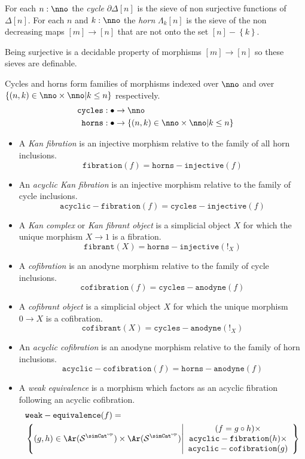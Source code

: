 \documentclass{tac}
\newcommand\cat\mathcal
\newcommand\set[1]{\left\{#1\right\}}
\newcommand\dual{^{\mathrm{op}}}
\newcommand\s{^{\simCat\dual}}
\newcommand\bang{!}
\newcommand\of{:}
\newcommand\simplex\Delta
\newcommand\cycle{\partial\Delta}
\newcommand\horn\Lambda
\newcommand\code\mathtt
\begin{document}
\begin{definition} For each $n\of \nno$ the \emph{cycle} $\cycle[n]$ is the sieve of non surjective functions of $\simplex[n]$. For each $n$ and $k\of\nno$ the \emph{horn} $\horn_k[n]$ is the sieve of the non decreasing maps $[m]\to [n]$ that are not onto the set $[n]-\set{k}$. 
\end{definition}

Being surjective is a decidable property of morphisms $[m]\to[n]$ so these sieves are definable. 

\begin{definition} Cycles and horns form families of morphisms indexed over $\nno$ and over $\set{(n,k)\in\nno\times\nno| k\leq n }$ respectively.
\begin{align*} 
\code{cycles}&\of\bullet\to \nno\\
 \code{horns}&\of\bullet\to\set{(n,k)\in\nno\times\nno| k\leq n }
\end{align*}
\begin{itemize}
\item A \emph{Kan fibration} is an injective morphism relative to the family of all horn inclusions.
\[ \code{fibration}(f) = \code{horns-injective}(f) \]
\item An \emph{acyclic Kan fibration} is an injective morphism relative to the family of cycle inclusions.
\[ \code{acyclic-fibration}(f) = \code{cycles-injective}(f) \]
\item A \emph{Kan complex} or \emph{Kan fibrant object} is a simplicial object $X$ for which the unique morphism $X\to 1$ is a fibration.
\[ \code{fibrant}(X) = \code{horns-injective}(\bang_X) \]
\item A \emph{cofibration} is an anodyne morphism relative to the family of cycle inclusions.
\[ \code{cofibration}(f) = \code{cycles-anodyne}(f) \]
\item A \emph{cofibrant object} is a simplicial object $X$ for which the unique morphism $0\to X$ is a cofibration.
\[ \code{cofibrant}(X) = \code{cycles-anodyne}(\bang_X) \]
\item An \emph{acyclic cofibration} is an anodyne morphism relative to the family of horn inclusions.
\[ \code{acyclic-cofibration}(f) = \code{horns-anodyne}(f) \]
\item A \emph{weak equivalence} is a morphism which factors as an acyclic fibration following an acyclic cofibration.
\begin{align*} 
&\code{weak-equivalence}(f) =\\
&\set{(g,h)\in \Ar(\cat S\s)\times\Ar(\cat S\s) \middle| \begin{array}{c}
(f=g\circ h)\times\\
\code{acyclic-fibration}(h)\times\\
\code{acyclic-cofibration}(g)
\end{array}}
\end{align*}
\end{itemize}\label{Kan}



\end{definition}
\end{document}
